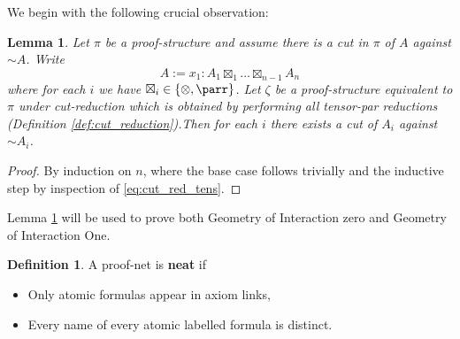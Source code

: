 \documentclass[12pt]{article}
\theoremstyle{plain}
\newtheorem{lemma}[thm]{Lemma}
\theoremstyle{definition}
\newtheorem{defn}[thm]{Definition} %
\newcommand{\negation}{\sim}
\begin{document}
We begin with the following crucial observation:
\begin{lemma}\label{lem:GoI_lemma}
Let $\pi$ be a proof-structure and assume there is a cut in $\pi$ of $A$ against $\negation A$. Write
\begin{equation}
A := x_1: A_1 \boxtimes_1 \hdots \boxtimes_{n-1} A_n
\end{equation}
where for each $i$ we have $\boxtimes_i \in \lbrace \otimes, \parr\rbrace$. Let $\zeta$ be a proof-structure equivalent to $\pi$ under cut-reduction which is obtained by performing all tensor-par reductions (Definition \ref{def:cut_reduction}).Then for each $i$ there exists a cut of $A_i$ against $\negation A_i$.
\end{lemma}
\begin{proof}
By induction on $n$, where the base case follows trivially and the inductive step by inspection of \eqref{eq:cut_red_tens}.
\end{proof}
Lemma \ref{lem:GoI_lemma} will be used to prove both Geometry of Interaction zero and Geometry of Interaction One.
\begin{defn}
A proof-net is \textbf{neat} if
\begin{itemize}
\item Only atomic formulas appear in axiom links,
\item Every name of every atomic labelled formula is distinct.
\end{itemize}
\end{defn}
\end{document}
